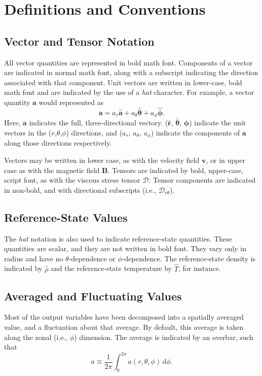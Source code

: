 \documentclass[10pt, letterpaper]{article}
\begin{document}
\section{Definitions and Conventions}
\subsection{Vector and Tensor Notation}
All vector quantities are represented in bold math font.  Components of a vector are indicated in normal math font, along with a subscript indicating the direction associated with that component.  Unit vectors are written in lower-case, bold math font and are indicated by the use of a \textit{hat} character.  For example, a vector quantity $\boldsymbol{a}$ would represented as
\begin{equation}
\label{eq:vcomp}
\boldsymbol{a} = a_r\boldsymbol{\hat{a}}+a_\theta\boldsymbol{\hat{\theta}}+a_\phi\boldsymbol{\hat{\phi}}.
\end{equation}
Here, $\boldsymbol{a}$ indicates the full, three-directional vectory.  ($\boldsymbol{\hat{r}}$, $\boldsymbol{\hat{\theta}}$, $\boldsymbol{\hat{\phi}}$) indicate the unit vectors in the ($r$,$\theta$,$\phi$) directions, and ($a_r$, $a_\theta$, $a_\phi$) indicate the components of $\boldsymbol{a}$ along those directions respectively.

Vectors may be written in lower case, as with the velocity field $\boldsymbol{v}$, or in upper case as with the magnetic field $\boldsymbol{B}$.   Tensors are indicated by bold, upper-case, script font, as with the viscous stress tensor $\boldsymbol{\mathcal{D}}$.  Tensor components are indicated in non-bold, and with directional subscripts (i.e., $\mathcal{D}_{r\theta}$).

\subsection{Reference-State Values}
The \textit{hat} notation is also used to indicate reference-state quantities.  These quantities are scalar, and they are not written in bold font.  They vary only in radius and have no $\theta$-dependence or $\phi$-dependence.  The reference-state density is indicated by $\hat{\rho}$ and the reference-state temperature by $\hat{T}$, for instance.

\subsection{Averaged and Fluctuating Values}
Most of the output variables have been decomposed into a spatially averaged value, and a fluctuation about that average.  By default, this average is taken along the zonal (i.e., $\phi$) dimension.  The average is indicated by an overbar, such that
\begin{equation}
\label{eq:avging}
\overline{a}\equiv \frac{1}{2\pi}\int_{0}^{2\pi} a(r,\theta,\phi)\, \mathrm{d}\phi.
\end{equation}
\end{document}
